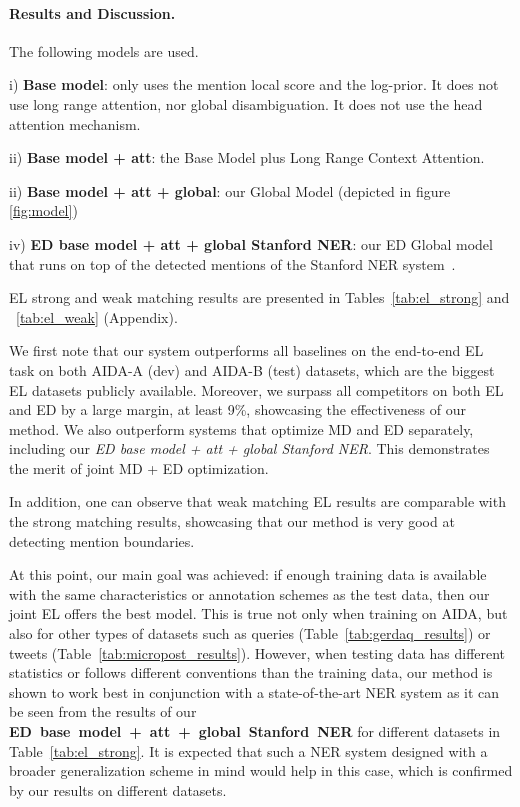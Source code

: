 \documentclass[11pt,a4paper]{article}
\begin{document}
\paragraph{Results and Discussion.}


The following models are used. 

i) \textbf{Base model}: only uses the mention local score and the log-prior. It does not use long range attention, nor global disambiguation. It does not use the head attention mechanism. 

ii) \textbf{Base model + att}: the Base Model plus Long Range Context Attention. 

ii) \textbf{Base model + att + global}: our Global Model (depicted in figure \ref{fig:model}) 

iv) \textbf{ED base model + att + global Stanford NER}: our ED Global model that runs on top of the detected mentions of the Stanford NER system~\citep{finkel2005incorporating}.

EL strong and weak matching results are presented in Tables~\ref{tab:el_strong} and ~\ref{tab:el_weak} (Appendix).

We first note that our system outperforms all baselines on the end-to-end EL task on both AIDA-A (dev) and AIDA-B (test) datasets, which are the biggest EL datasets publicly available. Moreover, we surpass all competitors on both EL and ED by a large margin, at least 9\%, showcasing the effectiveness of our method. We also outperform systems that optimize MD and ED separately, including our \textit{ED base model + att + global Stanford NER}. This demonstrates the merit of joint MD + ED optimization. 

In addition, one can observe that weak matching EL results are comparable with the strong matching results, showcasing that our method is very good at detecting mention boundaries. 




At this point, our main goal was achieved: if enough training data is available with the same characteristics or annotation schemes as the test data, then our joint EL offers the best model. This is true not only when training on AIDA, but also for other types of datasets such as queries (Table~\ref{tab:gerdaq_results}) or tweets (Table~\ref{tab:micropost_results}). However, when testing data  has different statistics or follows different conventions than the training data, our method is shown to work best in conjunction with a state-of-the-art NER system as it can be seen from the results of our \mbox{\textbf{ED base model + att + global Stanford NER}} for different datasets in Table~\ref{tab:el_strong}. It is expected that such a NER system designed with a broader generalization scheme in mind would help in this case, which is confirmed by our results on different datasets.
\end{document}
